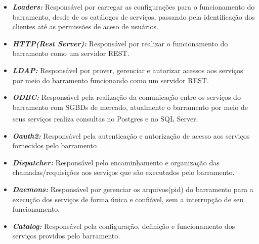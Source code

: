 {\begin{itemize}
    \item \textit{\textbf{Loaders:}}
    Responsável por carregar as configurações para o funcionamento do barramento, desde de os catálogos de serviços, passando pela identificação dos clientes até as permissões de aceso de usuários.  
    \item \textit{\textbf{HTTP(Rest Server):}}
    Responsável por realizar o funcionamento do barramento como um servidor \acrshort{REST}.
    \item \textit{\textbf{LDAP:}}
    Responsável por prover, gerenciar e autorizar acessos aos serviços por meio do barramento funcionando como um servidor REST.
    \item \textit{\textbf{ODBC:}}
    Responsável pela realização da comunicação entre os serviços do barramento com SGBDs de mercado, atualmente o barramento por meio de seus serviços realiza consultas no Postgres\textsuperscript{\textregistered} e no SQL Server\textsuperscript{\textregistered}.
    \item \textit{\textbf{Oauth2:}}
    Responsável pela autenticação e autorização de acesso aos serviços fornecidos pelo barramento
    \item \textit{\textbf{Dispatcher:}}
    Responsável pelo encaminhamento e organização das chamadas/requisições aos serviços que são executados pelo barramento.
    \item \textit{\textbf{Daemons:}}
    Responsável por gerenciar os arquivos(pid) do barramento para a execução dos serviços de forma única e confiável, sem a interrupção de seu funcionamento. 
    \item \textit{\textbf{Catalog:}}
    Responsável pela configuração, definição e funcionamento dos serviços providos pelo barramento.
\end{itemize}

}

